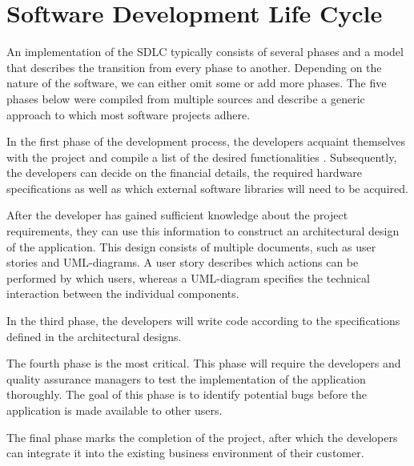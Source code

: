 
\section{Software Development Life Cycle}\label{sec:se-sdlc}
An implementation of the SDLC typically consists of several phases and a model that describes the transition from every phase to another. Depending on the nature of the software, we can either omit some or add more phases. The five phases below were compiled from multiple sources \cite{2010govardhan, 7106435} and describe a generic approach to which most software projects adhere.
\begin{enumerate}
	 In the first phase of the development process, the developers acquaint themselves with the project and compile a list of the desired functionalities \cite{7106435}. Subsequently, the developers can decide on the financial details, the required hardware specifications as well as which external software libraries will need to be acquired.
	
	 After the developer has gained sufficient knowledge about the project requirements, they can use this information to construct an architectural design of the application. This design consists of multiple documents, such as user stories and UML-diagrams. A user story describes which actions can be performed by which users, whereas a UML-diagram specifies the technical interaction between the individual components.
	
	 In the third phase, the developers will write code according to the specifications defined in the architectural designs.
	
	 The fourth phase is the most critical. This phase will require the developers and quality assurance managers to test the implementation of the application thoroughly. The goal of this phase is to identify potential bugs before the application is made available to other users.
	
	 The final phase marks the completion of the project, after which the developers can integrate it into the existing business environment of their customer.
\end{enumerate}

